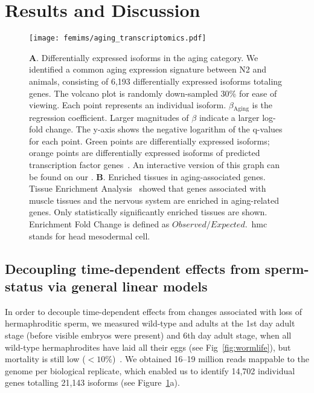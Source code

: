 \section*{Results and Discussion}
\begin{figure}[htbp]
  \renewcommand{\familydefault}{\sfdefault}\normalfont{}
  \centering
  \texttt{[image: femims/aging\_transcriptomics.pdf]}
  \caption{
    \textbf{A}. Differentially expressed isoforms in the aging category.
    We identified a common aging expression signature between N2 and
    \fog{} animals, consisting of 6,193 differentially expressed isoforms
    totaling \agen{} genes. The volcano plot is randomly down-sampled 30\% for
    ease of viewing. Each point represents an individual isoform.
    $\beta{}_\mathrm{Aging}$ is the regression coefficient. Larger magnitudes of
    $\beta$ indicate a larger log-fold change. The y-axis shows the negative
    logarithm of the q-values for each point. Green points are differentially
    expressed isoforms; orange points are differentially expressed isoforms of
    predicted transcription factor genes~\citep{Reece-Hoyes2005}. An interactive
    version of this graph can be found on our \webref{}.
    \textbf{B}. Enriched tissues in aging-associated genes. Tissue
    Enrichment Analysis~\citep{Angeles-Albores2016} showed that genes associated
    with muscle tissues and the nervous system are enriched in aging-related
    genes. Only statistically significantly enriched tissues are shown.
    Enrichment Fold Change is defined as $Observed/Expected$.\ hmc stands for
    head mesodermal cell.
  }
\label{fig:agingtranscriptome}
\end{figure}

\subsection*{Decoupling time-dependent effects from sperm-status via general
linear models}
\label{sub:Transcriptomics}
In order to decouple time-dependent effects from changes associated with loss of
hermaphroditic sperm, we measured wild-type and \fog{} adults at the 1st day
adult stage (before visible embryos were present) and 6th day adult stage, when
all wild-type hermaphrodites have laid all their eggs (see
Fig~\ref{fig:wormlife}), but mortality is still low
($<10\%$)~\citep{Stroustrup2013}.  We obtained 16--19 million reads mappable to
the \cel{} genome per biological replicate, which enabled us to identify 14,702
individual genes totalling 21,143 isoforms (see
Figure~\ref{fig:agingtranscriptome}a).

